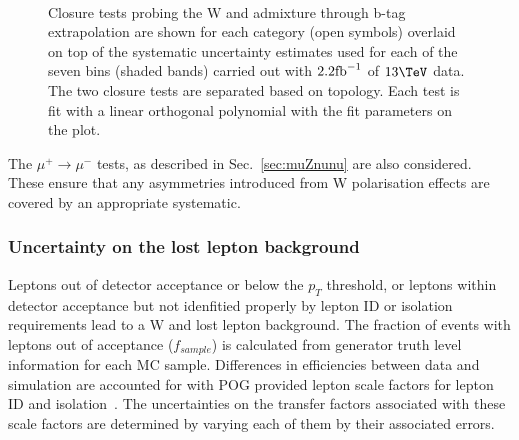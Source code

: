 \begin{figure}[h!]
  \begin{center}
    ~~
    \caption{Closure tests probing the W and \ttbar admixture through
      b-tag extrapolation are shown for each
      \njet category (open symbols) overlaid on top of the systematic
      uncertainty estimates used for each of the seven \scalht bins
      (shaded bands) carried out with $2.2\ifb$ of $13\tev$
      data. The two closure tests are separated based on topology.
      Each test is fit with a linear orthogonal polynomial with the
      fit parameters on the plot.}
    \label{fig:closureBTag}
  \end{center} 
\end{figure}

The $\mu^{+}\rightarrow\mu^{-}$ tests, as described in Sec.~\ref{sec:muZnunu} are also
considered. These ensure
that any asymmetries introduced from W polarisation effects are covered by
an appropriate systematic.

\subsubsection{Uncertainty on the lost lepton background}

Leptons out of detector 
acceptance or below the $p_{T}$ threshold, or leptons within detector
acceptance but not idenfitied properly by lepton ID or isolation
requirements lead to a W and \ttbar lost lepton background. The
fraction of events with leptons out of acceptance ($f_{sample}$)
is calculated from generator truth level information for each MC
sample. Differences in efficiencies between data and simulation are
accounted for with POG provided lepton scale
factors for lepton ID and isolation~\cite{twiki-leptonSF}. The
uncertainties on the transfer factors associated 
with these scale factors are determined by varying each of them by
their associated errors.

